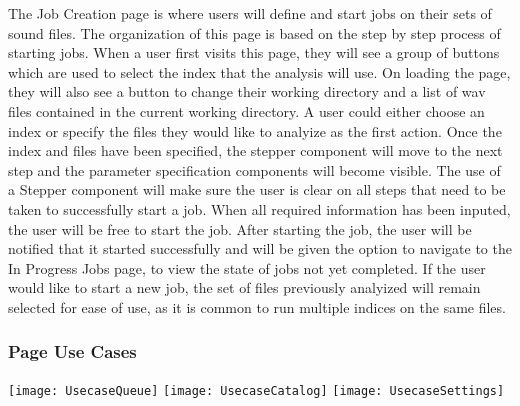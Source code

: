 The Job Creation page is where users will define and start jobs on their sets of sound files. The organization of this page is based on the step by step process of starting jobs. When a user first visits this page, they will see a group of buttons which are used to select the index that the analysis will use. On loading the page, they will also see a button to change their working directory and a list of wav files contained in the current working directory. A user could either choose an index or specify the files they would like to analyize as the first action. Once the index and files have been specified, the stepper component will move to the next step and the parameter specification components will become visible. The use of a Stepper component will make sure the user is clear on all steps that need to be taken to successfully start a job. When all required information has been inputed, the user will be free to start the job. After starting the job, the user will be notified that it started successfully and will be given the option to navigate to the In Progress Jobs page, to view the state of jobs not yet completed. If the user would like to start a new job, the set of files previously analyized will remain selected for ease of use, as it is common to run multiple indices on the same files.

\subsubsection{Page Use Cases}
\texttt{[image: UsecaseQueue]}
\texttt{[image: UsecaseCatalog]}
\texttt{[image: UsecaseSettings]}

